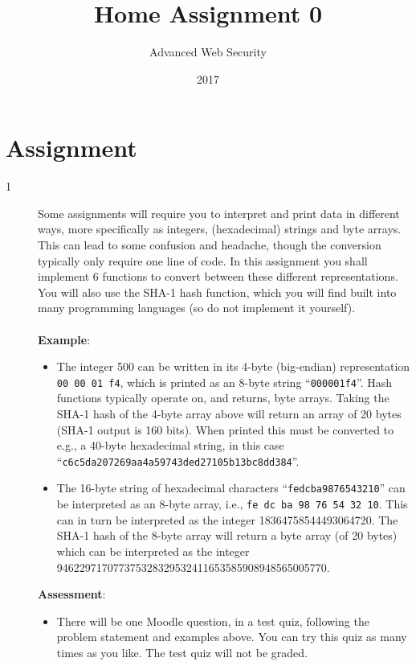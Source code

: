\documentclass{article}
\begin{document}
\title{Home Assignment 0}
\author{Advanced Web Security}
\date{2017}

\maketitle

\section*{Assignment}

\begin{description}
	\item[1~~~]{Some assignments will require you to interpret and print data in different ways, more specifically as integers, 
		(hexadecimal) strings and byte arrays. This can lead to some confusion and headache, though the conversion typically only require one line of code. 
		In this assignment you shall implement 6 functions to convert between these different representations. 
		You will also use the SHA-1 hash function, which you will find built into many programming languages (so do not implement it yourself).\\\\
    \textbf{Example}:
    
	\begin{itemize}
		\item The integer 500 can be written in its 4-byte (big-endian) representation \texttt{00 00 01 f4}, 
			which is printed as an 8-byte string ``\texttt{000001f4}''. Hash functions typically operate on, and returns, byte arrays. 
			Taking the SHA-1 hash of the 4-byte array above will return an array of 20 bytes (SHA-1 output is 160 bits). 
			When printed this must be converted to e.g., a 40-byte hexadecimal string, in this case ``\texttt{c6c5da207269aa4a59743ded27105b13bc8dd384}''.

		\item The 16-byte string of hexadecimal characters ``\texttt{fedcba9876543210}'' can be interpreted as an 8-byte array, 
			i.e., \texttt{fe dc ba 98 76 54 32 10}. This can in turn be interpreted as the integer 18364758544493064720. 
			The SHA-1 hash of the 8-byte array will return a byte array (of 20 bytes) which can be interpreted as the integer 946229717077375328329532411653585908948565005770.
    \end{itemize}
	
	\textbf{Assessment}:
	\begin{itemize}
		\item There will be one Moodle question, in a test quiz, following the problem statement and examples above. You can try this quiz as many times as you like. The test quiz will not be graded.
	\end{itemize}
	}
\end{description}
\end{document}
